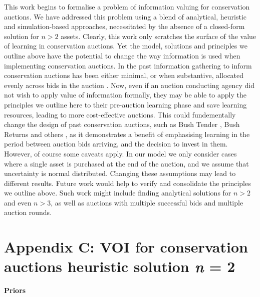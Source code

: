 \documentclass[]{article}
\theoremstyle{definition}
\theoremstyle{definition}
\theoremstyle{remark}
\begin{document}
This work begins to formalise a problem of information valuing for
conservation auctions. We have addressed this problem using a blend of
analytical, heuristic and simulation-based approaches, necessitated by
the absence of a closed-form solution for \(n>2\) assets. Clearly, this
work only scratches the surface of the value of learning in conservation
auctions. Yet the model, solutions and principles we outline above have
the potential to change the way information is used when implementing
conservation auctions. In the past information gathering to inform
conservation auctions has been either minimal, or when substantive,
allocated evenly across bids in the auction \citep[see
e.g.,][]{Miles2008}. Now, even if an auction conducting agency did not
wish to apply value of information formally, they may be able to apply
the principles we outline here to their pre-auction learning phase and
save learning resources, leading to more cost-effective auctions. This
could fundementally change the design of past conservation auctions,
such as Bush Tender \citep{Stoneham2003}, Bush Returns \citep{Miles2008}
and others \citep[e.g.,][]{Lobley1998, Hajkowicz2007, Hanley2014}, as it
demonstrates a benefit of emphasising learning in the period between
auction bids arriving, and the decision to invest in them. However, of
course some caveats apply. In our model we only consider cases where a
single asset is purchased at the end of the auction, and we assume that
uncertainty is normal distributed. Changing these assumptions may lead
to different results. Future work would help to verify and consolidate
the principles we outline above. Such work might include finding
analytical solutions for \(n > 2\) and even \(n > 3\), as well as
auctions with multiple successful bids and multiple auction rounds.



\newpage

\captionsetup{labelformat=empty}

\section*{\texorpdfstring{Appendix C: VOI for conservation auctions
heuristic solution \emph{n} =
2}{Appendix C: VOI for conservation auctions heuristic solution n = 2}}\label{appendix-c-voi-for-conservation-auctions-heuristic-solution-n-2}

\textbf{Priors}
\end{document}
